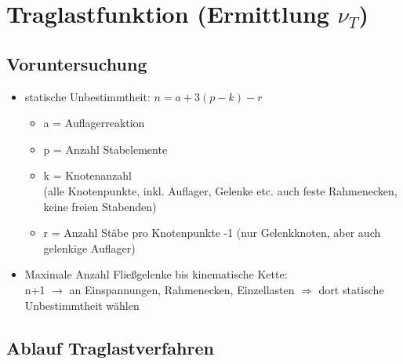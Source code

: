 \documentclass[fleqn,twoside]{article}
\begin{document}
\section{Traglastfunktion (Ermittlung $\nu_T$)}

    \subsection{Voruntersuchung}

        \begin{itemize}
            \item statische Unbestimmtheit: $n = a + 3(p-k)-r$
                \begin{itemize}
                    \item a = Auflagerreaktion
                    \item p = Anzahl Stabelemente
                    \item k = Knotenanzahl \\ (alle Knotenpunkte, inkl. Auflager, Gelenke etc. auch feste Rahmenecken, keine freien Stabenden)
                    \item r = Anzahl Stäbe pro Knotenpunkte -1 (nur Gelenkknoten, aber auch gelenkige Auflager)
                \end{itemize}

            \item Maximale Anzahl Fließgelenke bis kinematische Kette:\\
            n+1 $\rightarrow$ an Einspannungen, Rahmenecken, Einzellasten $\Rightarrow$ dort statische Unbestimmtheit wählen
        \end{itemize}

    \subsection{Ablauf Traglastverfahren}
\end{document}
